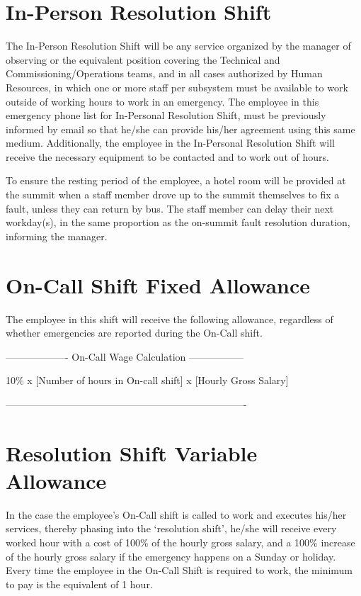 \section{In-Person Resolution Shift}

The In-Person Resolution Shift will be any service organized by the manager of observing or the equivalent position covering the Technical and Commissioning/Operations teams, and in all cases authorized by Human Resources, in which one or more staff per subsystem must be available to work outside of working hours to work in an emergency.
The employee in this emergency phone list for In-Personal Resolution Shift, must be previously informed by email so that he/she can provide his/her agreement using this same medium. Additionally, the employee in the In-Personal Resolution Shift will receive the necessary equipment to be contacted and to work out of hours.

To ensure the resting period of the employee, a hotel room will be provided at the summit when a staff member drove up to the summit themselves to fix a fault, unless they can return by bus.  The staff member can delay their next workday(s), in the same proportion as the on-summit fault resolution duration, informing the manager.

\section{On-Call Shift Fixed Allowance}

The employee in this shift will receive the following allowance, regardless of whether emergencies are reported during the On-Call shift.

\begin{center} -------------------  On-Call Wage Calculation ----------------- \end{center}
10\% x [Number of hours in On-call shift] x [Hourly Gross Salary]
\begin{center} ------------------------------------------------------------------------- \end{center}


\section{Resolution Shift Variable Allowance}

In the case the employee's On-Call shift is called to work and executes his/her services, thereby phasing into the `resolution shift', he/she will receive every worked hour with a cost of 100\% of the hourly gross salary, and a 100\% increase of the hourly gross salary if the emergency happens on a Sunday or holiday. Every time the employee in the On-Call Shift is required to work, the minimum to pay is the equivalent of 1 hour.

